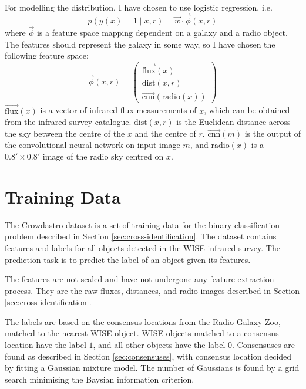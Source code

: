     For modelling the distribution, I have chosen to use logistic regression,
    i.e.
    \begin{equation}
        \label{eq:logistic-regression-cross-identification}
        p(y(x) = 1 \mid x, r) = \vec w \cdot \vec \phi(x, r)
    \end{equation}
    where $\vec \phi$ is a feature space mapping dependent on a galaxy and a
    radio object. The features should represent the galaxy in some way, so I
    have chosen the following feature space:
    \begin{equation}
        \label{eq:galaxy-features}
        \vec \phi(x, r) = \begin{pmatrix}
            \vec{\mbox{flux}}(x)\\
            \mbox{dist}(x, r)\\
            \vec{\mbox{cnn}}(\mbox{radio}(x))
        \end{pmatrix}
    \end{equation}
    $\vec{\mbox{flux}}(x)$ is a vector of infrared flux measurements of $x$,
    which can be obtained from the infrared survey catalogue. $\mbox{dist}(x,
    r)$ is the Euclidean distance across the sky between the centre of the $x$
    and the centre of $r$. $\vec{\mbox{cnn}}(m)$ is the output of the
    convolutional neural network on input image $m$, and $\mbox{radio}(x)$ is a
    $0.8' \times 0.8'$ image of the radio sky centred on $x$.

\section{Training Data}
\label{sec:training-data}
  
  The Crowdastro dataset is a set of training data for the binary
  classification problem described in Section \ref{sec:cross-identification}.
  The dataset contains features and labels for all objects detected in the WISE
  infrared survey. The prediction task is to predict the label of an object
  given its features.

  The features are not scaled and have not undergone any feature extraction
  process. They are the raw fluxes, distances, and radio images described in
  Section \ref{sec:cross-identification}.

  The labels are based on the consensus locations from the Radio Galaxy Zoo,
  matched to the nearest WISE object. WISE objects matched to a consensus
  location have the label $1$, and all other objects have the label $0$.
  Consensuses are found as described in Section \ref{sec:consensuses}, with
  consensus location decided by fitting a Gaussian mixture model. The number of
  Gaussians is found by a grid search minimising the Baysian information
  criterion.

